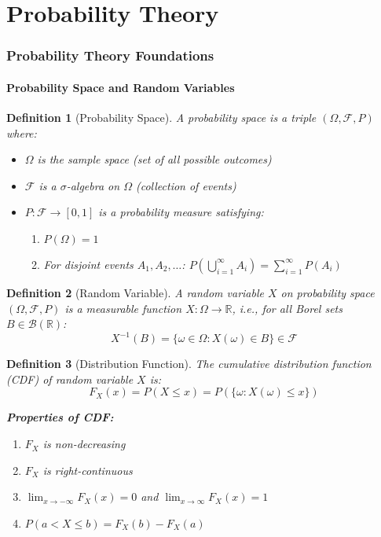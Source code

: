 \documentclass[12pt,a4paper]{article}
\newtheorem{definition}{Definition}[section]
\theoremstyle{remark}
\begin{document}
\part{Probability Theory}

\section{Probability Theory Foundations}

\subsection{Probability Space and Random Variables}

\begin{definition}[Probability Space]
A probability space is a triple $(\Omega, \mathcal{F}, P)$ where:
\begin{itemize}
\item $\Omega$ is the sample space (set of all possible outcomes)
\item $\mathcal{F}$ is a $\sigma$-algebra on $\Omega$ (collection of events)
\item $P: \mathcal{F} \to [0,1]$ is a probability measure satisfying:
  \begin{enumerate}
  \item $P(\Omega) = 1$
  \item For disjoint events $A_1, A_2, \ldots$: $P(\bigcup_{i=1}^{\infty} A_i) = \sum_{i=1}^{\infty} P(A_i)$
  \end{enumerate}
\end{itemize}
\end{definition}

\begin{definition}[Random Variable]
A random variable $X$ on probability space $(\Omega, \mathcal{F}, P)$ is a measurable function $X: \Omega \to \mathbb{R}$, i.e., for all Borel sets $B \in \mathcal{B}(\mathbb{R})$:
$$X^{-1}(B) = \{\omega \in \Omega : X(\omega) \in B\} \in \mathcal{F}$$
\end{definition}

\begin{definition}[Distribution Function]
The cumulative distribution function (CDF) of random variable $X$ is:
$$F_X(x) = P(X \leq x) = P(\{\omega : X(\omega) \leq x\})$$

\textbf{Properties of CDF:}
\begin{enumerate}
\item $F_X$ is non-decreasing
\item $F_X$ is right-continuous
\item $\lim_{x \to -\infty} F_X(x) = 0$ and $\lim_{x \to \infty} F_X(x) = 1$
\item $P(a < X \leq b) = F_X(b) - F_X(a)$
\end{enumerate}
\end{definition}
\end{document}
